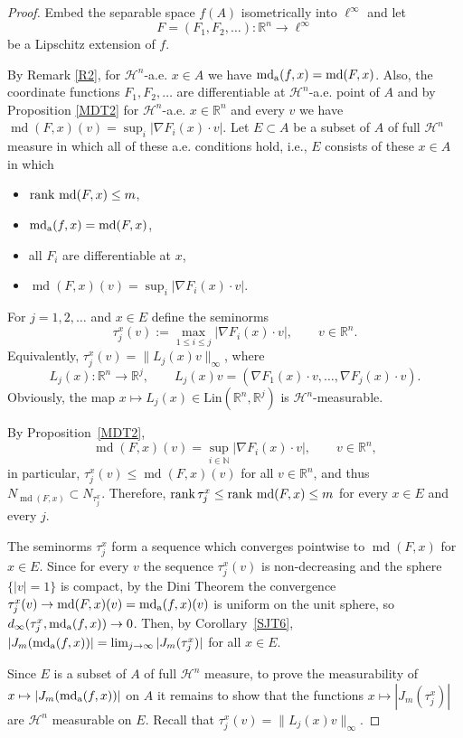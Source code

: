 \documentclass[12pt,leqno]{amsart}
\theoremstyle{definition}
\newcommand{\bbbn}{\mathbb N}
\newcommand{\bbbr}{\mathbb R}
\def\H{{\mathcal H}}
\def\rank{{\rm rank\,}}
\def\md{\operatorname{md}}
\def\apmd{\operatorname{md_{\rm a}}}
\numberwithin{theorem}{section} \numberwithin{equation}{section}
\begin{document}
\begin{proof}
Embed the separable space $f(A)$ isometrically into $\ell^\infty$ and let
$$
F=(F_1,F_2,\ldots):\bbbr^n\to\ell^\infty
$$
be a Lipschitz extension of $f$.

By Remark \ref{R2}, for $\H^n$-a.e. $x\in A$ we have $\apmd(f,x)=\md(F,x)$. Also, the coordinate functions $F_1,F_2,\ldots$ are differentiable at $\H^n$-a.e. point of $A$ and by Proposition \ref{MDT2} for \mbox{$\H^n$-a.e.} $x\in\bbbr^n$ and every $v$ we have $\md(F,x)(v)=\sup_i|\nabla F_i(x)\cdot v|$. Let $E\subset A$ be a subset of $A$ of full $\H^n$ measure in which all of these a.e. conditions hold, i.e., $E$ consists of these $x\in A$ in which
\begin{itemize}
    \item $\rank \md (F,x)\leq m$,
    \item $\apmd(f,x)=\md(F,x)$,
    \item all $F_i$ are differentiable at $x$,
    \item $\md(F,x)(v)=\sup_i|\nabla F_i(x)\cdot v|$.
\end{itemize}
For $j=1,2,\ldots$ and $x\in E$ define the seminorms
$$
\tau_j^x(v):=
\max_{1\leq i\leq j} |\nabla F_i(x)\cdot v|,\qquad v\in\bbbr^n.
$$
Equivalently, $\tau_j^x(v)=\|L_j(x)v\|_\infty$, where
$$
L_j(x):\bbbr^n\to\bbbr^j,
\qquad
L_j(x)v
=
\left(
\nabla F_1(x)\cdot v,\ldots,\nabla F_j(x)\cdot v
\right).
$$
Obviously, the map $x\mapsto L_j(x)\in \mathrm{Lin}(\bbbr^n,\bbbr^j)$ is $\H^n$-measurable.

By Proposition~\ref{MDT2},
$$
\md(F,x)(v)=\sup_{i\in\bbbn}|\nabla F_i(x)\cdot v|,
\qquad v\in\bbbr^n,
$$
in particular, $\tau_j^x(v)\leq\md(F,x)(v)$ for all $v\in\bbbr^n$, and thus $N_{\md(F,x)} \subset N_{\tau_j^x}$. Therefore, $\rank \tau_j^x\leq \rank \md (F,x)\leq m$ for every $x\in E$ and every $j$.

The seminorms $\tau_j^x$ form a sequence which converges pointwise to $\md(F,x)$ for $x\in E$.
Since for every $v$ the sequence $\tau_j^x(v)$ is non-decreasing and the sphere $\{|v|=1\}$ is compact, by the Dini Theorem the convergence $\tau_j^x(v)\to \md(F,x)(v)=\apmd(f,x)(v)$ is uniform on the unit sphere, so $d_\infty(\tau_j^x,\apmd(f,x))\to 0$. Then, by Corollary~\ref{SJT6}, $|J_m(\apmd(f,x))|=\lim_{j\to\infty}|J_m(\tau_j^x)|$ for all $x\in E$.

Since $E$ is a subset of $A$ of full $\H^n$ measure, to prove the measurability of  $x\mapsto |J_m(\apmd(f,x))|$ on $A$ it remains to show that the functions $x\mapsto |J_m(\tau_j^x)|$ are $\H^n$ measurable on $E$. Recall that $\tau_j^x(v)=\|L_j(x)v\|_{\infty}$.


\end{proof}
\end{document}
